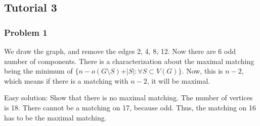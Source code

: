 \documentclass[11pt]{article}
\begin{document}
\subsection{Tutorial 3}
\label{sec:orgdafa4d1}
\subsubsection{Problem 1}
\label{sec:orgcd65943}
We draw the graph, and remove the edges 2, 4, 8, 12. Now there are 6 odd
number of components. There is a characterization about the maximal matching
being the minimum of \(\{n - o(G\setminus S) + \vert S\vert\colon \forall S
    \subset V(G)\}\). Now, this is \(n-2\), which means if there is a matching with
\(n-2\), it will be maximal.

Easy solution: Show that there is no maximal matching. The number of
vertices is 18. There cannot be a matching on 17, because odd. Thus, the
matching on 16 has to be the maximal matching.
\end{document}
